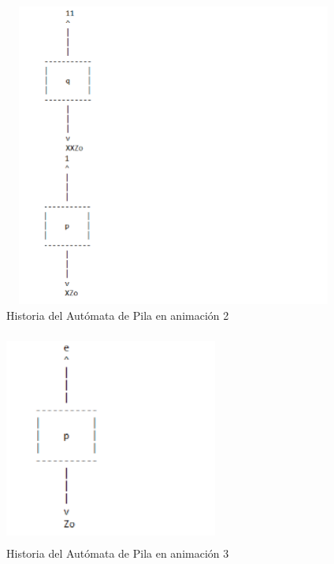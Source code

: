 	\begin{figure}[H]
		\begin{center}
			\includegraphics[width=14cm, height=10cm]{img/pila-manual-consola2.png}
			\caption{Historia del Autómata de Pila en animación 2}
			\label{fig:pila1b}
		\end{center}
	\end{figure}
	\begin{figure}[H]
		\begin{center}
			\includegraphics[width=7cm, height=7cm]{img/pila-manual-consola3.png}
			\caption{Historia del Autómata de Pila en animación 3}
			\label{fig:pila1c}
		\end{center}
	\end{figure}
